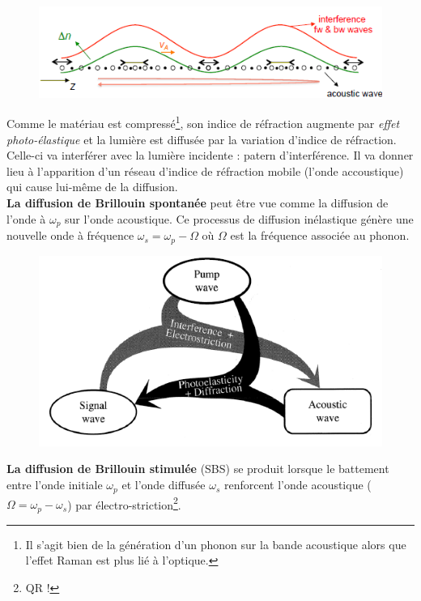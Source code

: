 	\begin{figure}
	\vspace{-5mm}
	\includegraphics[scale=0.5]{ch6/image25}
	\end{figure}
Comme le matériau est compressé\footnote{Il s'agit bien de la génération d'un phonon sur la bande
acoustique alors que l'effet Raman est plus lié à l'optique.}, son indice de réfraction augmente par 
\textit{effet photo-élastique} et la lumière est diffusée par la variation d'indice de réfraction. 
Celle-ci va interférer avec la lumière incidente : patern d'interférence. Il va donner lieu à 
l'apparition d'un réseau d'indice de réfraction mobile (l'onde accoustique) qui cause lui-même 
de la diffusion.\\

\textbf{La diffusion de Brillouin spontanée} peut être vue comme la diffusion de l'onde à 
$\omega_p$ sur l'onde acoustique. Ce processus de diffusion inélastique génère une nouvelle onde
à fréquence $\omega_s=\omega_p-\Omega$ où $\Omega$ est la fréquence associée au phonon.\\

	\begin{figure}
	\vspace{-5mm}
	\includegraphics[scale=0.4]{ch6/image26}
	\end{figure}
\textbf{La diffusion de Brillouin stimulée} (SBS) se produit lorsque le battement entre l'onde
initiale $\omega_p$ et l'onde diffusée $\omega_s$ renforcent l'onde acoustique ($\Omega =
\omega_p-\omega_s$) par électro-striction\footnote{QR !}.\\

